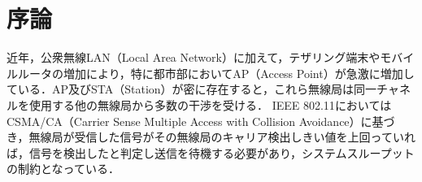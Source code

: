 \documentclass[master]{kuisthesis}		%
\begin{document}
\begin{eabstract}
\end{eabstract}

\tableofcontents				%



\section{序論} \label{序章}		%
近年，公衆無線LAN（Local Area Network）に加えて，テザリング端末やモバイルルータの増加により，特に都市部においてAP（Access Point）が急激に増加している．AP及びSTA（Station）が密に存在すると，これら無線局は同一チャネルを使用する他の無線局から多数の干渉を受ける．
IEEE 802.11\cite{11}においてはCSMA/CA（Carrier Sense Multiple Access with Collision Avoidance）に基づき，無線局が受信した信号がその無線局のキャリア検出しきい値を上回っていれば，信号を検出したと判定し送信を待機する必要があり，システムスループットの制約となっている．
\end{document}

